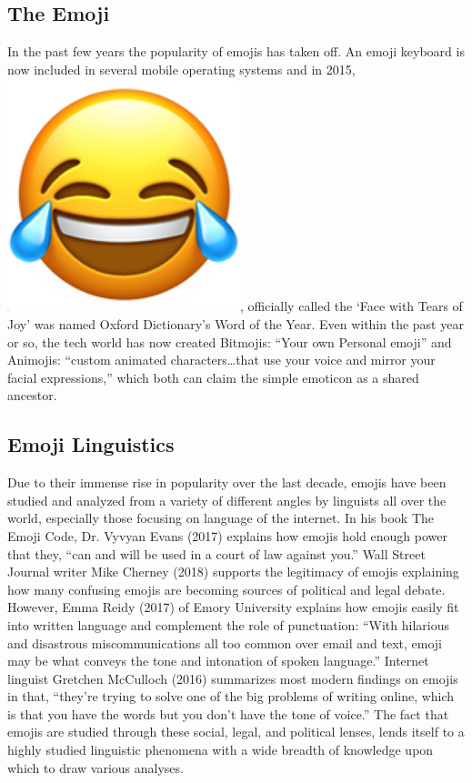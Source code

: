 \documentclass[a4paper,12pt]{article}
\begin{document}
\subsection{The Emoji}
In the past few years the popularity of emojis has taken off. An emoji keyboard is now included in several mobile operating systems and in 2015, \includegraphics[scale=0.035]{faceofjoy.png}, officially called the ‘Face with Tears of Joy’ was named Oxford Dictionary’s Word of the Year. Even within the past year or so, the tech world has now created Bitmojis: “Your own Personal emoji” and Animojis: “custom animated characters…that use your voice and mirror your facial expressions,” which both can claim the simple emoticon as a shared ancestor.

\subsection{Emoji Linguistics}
Due to their immense rise in popularity over the last decade, emojis have been studied and analyzed from a variety of different angles by linguists all over the world, especially those focusing on language of the internet. In his book The Emoji Code, Dr. Vyvyan Evans (2017) explains how emojis hold enough power that they, “can and will be used in a court of law against you.” Wall Street Journal writer Mike Cherney (2018) supports the legitimacy of emojis explaining how many confusing emojis are becoming sources of political and legal debate. However, Emma Reidy (2017) of Emory University explains how emojis easily fit into written language and complement the role of punctuation: “With hilarious and disastrous miscommunications all too common over email and text, emoji may be what conveys the tone and intonation of spoken language.” Internet linguist Gretchen McCulloch (2016) summarizes most modern findings on emojis in that, “they’re trying to solve one of the big problems of writing online, which is that you have the words but you don’t have the tone of voice.” The fact that emojis are studied through these social, legal, and political lenses, lends itself to a highly studied linguistic phenomena with a wide breadth of knowledge upon which to draw various analyses. 
\end{document}
